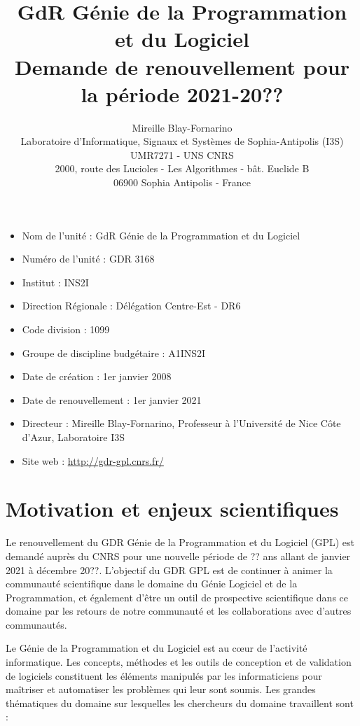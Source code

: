 \documentclass[11pt]{article}
\title{GdR Génie de la Programmation et du Logiciel\\ Demande de renouvellement pour la période 2021-20??}
\author{Mireille Blay-Fornarino\\
Laboratoire d'Informatique, Signaux et Systèmes de Sophia-Antipolis (I3S)\\ 
UMR7271 - UNS CNRS\\
2000, route des Lucioles - Les Algorithmes - bât. Euclide B\\
06900 Sophia Antipolis - France}
\begin{document}
\maketitle

\begin{itemize}
\item Nom de l'unité : GdR Génie de la Programmation et du Logiciel
\item Numéro de l'unité : GDR 3168
\item Institut : INS2I
\item Direction Régionale : Délégation Centre-Est - DR6
\item Code division : 1099
\item Groupe de discipline budgétaire : A1INS2I
\item Date de création : 1er janvier 2008
\item Date de renouvellement : 1er janvier 2021
\item Directeur : Mireille Blay-Fornarino, Professeur à l'Université de Nice Côte d'Azur, Laboratoire I3S
\item Site web : \url{http://gdr-gpl.cnrs.fr/}
\end{itemize}

\section{Motivation et enjeux scientifiques}

Le renouvellement du GDR Génie de la Programmation et du Logiciel (GPL) est
demandé auprès du CNRS pour une nouvelle période de ?? ans allant de janvier
2021 à décembre 20??.
L'objectif du GDR GPL est de continuer à animer la communauté scientifique dans
le domaine du Génie Logiciel et de la Programmation, et également d'être un outil de prospective scientifique dans ce domaine par les retours de notre communauté et les collaborations avec d'autres communautés.






Le Génie de la Programmation et du Logiciel est au c{\oe}ur de l'activité
informatique. Les concepts, méthodes et les outils de conception et de
validation de logiciels constituent les éléments manipulés par les
informaticiens pour maîtriser et automatiser les problèmes qui leur sont
soumis. Les grandes thématiques du domaine sur lesquelles les chercheurs du
domaine travaillent sont : 
\end{document}
